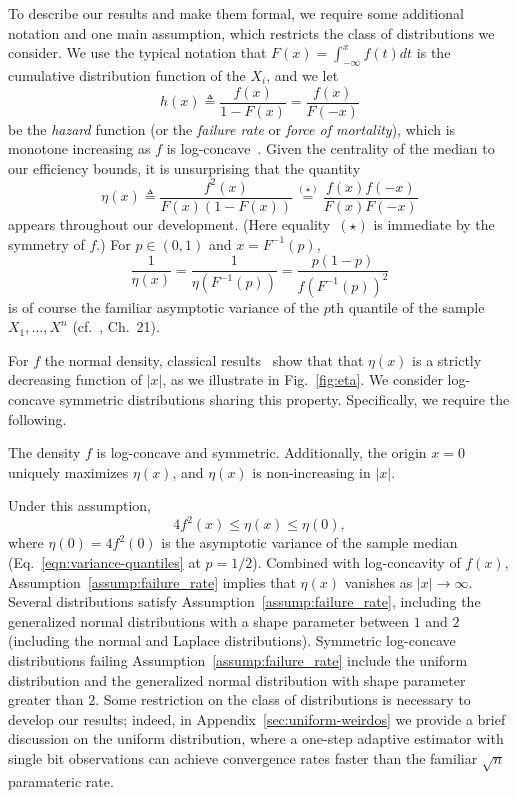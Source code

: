 To describe our results and make them formal, we require some additional
notation and one main assumption, which restricts the class of distributions
we consider.  We use the typical notation that
$F(x) = \int_{-\infty}^x f(t) dt$ is the cumulative distribution function
of the $X_i$, and we let
\begin{equation*}
  h(x) \triangleq \frac{f(x)}{1-F(x)} = \frac{f(x)}{F(-x)}
\end{equation*}
be the \emph{hazard} function (or the \emph{failure rate} or \emph{force of
  mortality}), which is monotone increasing as $f$ is
log-concave~\cite{bagnoli2005log}. Given the centrality of the median
to our efficiency bounds, it is unsurprising that the quantity
\begin{equation}
  \label{eq:eta_def}
  \eta(x) \triangleq \frac{f^2(x)}{F(x)(1-F(x))}
  \stackrel{(\star)}{=} \frac{f(x)f(-x)}{F(x)F(-x)}
\end{equation}
appears throughout our development. (Here equality~$(\star)$ is immediate by
the symmetry of $f$.)  For $p \in (0, 1)$ and $x = F^{-1}(p)$,
\begin{equation}
  \label{eqn:variance-quantiles}
  \frac{1}{\eta(x)} =
  \frac{1}{\eta(F^{-1}(p))}
  = \frac{p (1 - p)}{f(F^{-1}(p))^2}
\end{equation}
is of course the familiar asymptotic variance of the $p$th quantile of the sample $X_1,\ldots,X^n$ (cf.~\cite{VanDerVaart98}, Ch.~21).

For $f$ the normal density, classical results~\cite{Samford1953,
  hammersley1950estimating} show that that $\eta(x)$ is a strictly
decreasing function of $|x|$, as we illustrate in Fig.~\ref{fig:eta}.
%
We consider log-concave symmetric distributions sharing this
property.  Specifically, we require the following.
\begin{assumption}
  \label{assump:failure_rate}
  The density $f$ is log-concave and symmetric.  Additionally, the origin $x
  = 0$ uniquely maximizes $\eta(x)$, and $\eta(x)$ is non-increasing in
  $|x|$.
\end{assumption}
Under this assumption,
\begin{equation*}
  4 f^2(x) \leq \eta(x) \leq \eta(0),
\end{equation*} 
%
where $\eta(0) = 4 f^2(0)$ is the asymptotic variance of the sample median
(Eq.~\eqref{eqn:variance-quantiles} at $p = 1/2$).  Combined with
log-concavity of $f(x)$, Assumption~\ref{assump:failure_rate} implies that
$\eta(x)$ vanishes as $|x|\rightarrow \infty$.  Several distributions
satisfy Assumption~\ref{assump:failure_rate}, including the generalized
normal distributions with a shape parameter between $1$ and $2$ (including
the normal and Laplace distributions). Symmetric log-concave distributions
failing Assumption~\ref{assump:failure_rate} include the uniform
distribution and the generalized normal distribution with shape parameter
greater than $2$. Some restriction on the class of distributions is
necessary to develop our results; indeed, in
Appendix~\ref{sec:uniform-weirdos} we provide a brief discussion on the
uniform distribution, where a one-step adaptive estimator with single bit
observations can achieve convergence rates faster than the familiar
$\sqrt{n}$ paramateric rate.

